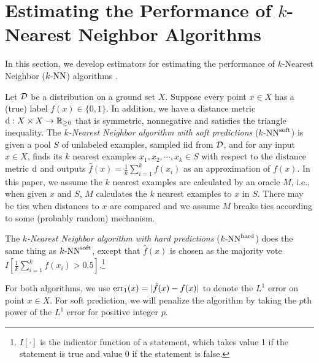 \section{Estimating the Performance of $k$-Nearest Neighbor Algorithms}
\label{sec:neighbor}
In this section, we develop estimators for estimating the performance of $k$-Nearest Neighbor (${\text{$k$-NN}}$) algorithms \citep{FH51,FH89,CH67}. 

Let ${\mathcal{D}}$ be a distribution on a ground set $X$. Suppose every point $x\in X$ has a (true) label $f(x)\in\{0,1\}$. In addition, we have a distance metric ${\mathrm{d}} :X\times X\rightarrow \mathbb{R}_{\geq 0}$ that is symmetric, nonnegative and satisfies the triangle inequality. The \emph{$k$-Nearest Neighbor algorithm with soft predictions} (${\text{$k$-NN}^{\mathrm{soft}}}$) is given a pool $S$ of unlabeled examples, sampled iid from ${\mathcal{D}}$, and for any input $x\in X$, finds its $k$ nearest examples $x_1,x_2,\cdots, x_k\in S$ with respect to the distance metric ${\mathrm{d}}$ and outputs $\hat{f}(x)=\frac{1}{k}\sum\limits_{i=1}^kf(x_i)$ as an approximation of $f(x)$. In this paper, we assume the $k$ nearest examples are calculated by an oracle $M$, i.e., when given $x$ and $S$, $M$ calculates the $k$ nearest examples to $x$ in $S$. There may be ties when distances to $x$ are compared and we assume $M$ breaks ties according to some (probably random) mechanism.

The \emph{$k$-Nearest Neighbor algorithm with hard predictions} (${\text{$k$-NN}^{\mathrm{hard}}}$) does the same thing as ${\text{$k$-NN}^{\mathrm{soft}}}$, except that $\hat{f}(x)$ is chosen as the majority vote $I[\frac{1}{k}\sum\limits_{i=1}^kf(x_i)>0.5]$.\footnote{$I[\cdot]$ is the indicator function of a statement, which takes value 1 if the statement is true and value 0 if the statement is false.}

For both algorithms, we use ${\mathrm{err}_1}(x)=|\hat f(x)-f(x)|$ to denote the $L^1$ error on point $x\in X$.  For soft prediction, we will penalize the algorithm by taking the $p$th power of the $L^1$ error for positive integer $p$.




